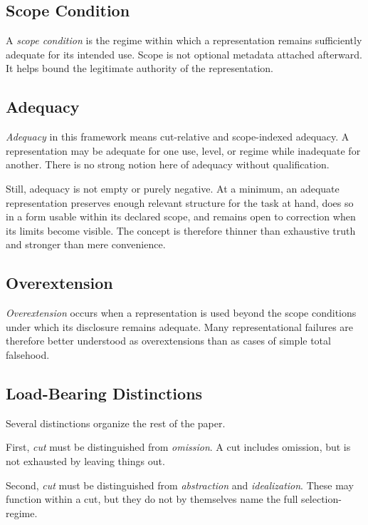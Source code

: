 \documentclass[11pt]{article}
\renewcommand{\emph}[1]{\textit{#1}}
\begin{document}
\subsection{Scope Condition}

A \emph{scope condition} is the regime within which a representation remains sufficiently adequate for its intended use. Scope is not optional metadata attached afterward. It helps bound the legitimate authority of the representation.

\subsection{Adequacy}

\emph{Adequacy} in this framework means cut-relative and scope-indexed adequacy. A representation may be adequate for one use, level, or regime while inadequate for another. There is no strong notion here of adequacy without qualification. \cite{frigg_nguyen_scientific_representation_sep,scientific_pluralism_sep}

Still, adequacy is not empty or purely negative. At a minimum, an adequate representation preserves enough relevant structure for the task at hand, does so in a form usable within its declared scope, and remains open to correction when its limits become visible. The concept is therefore thinner than exhaustive truth and stronger than mere convenience.

\subsection{Overextension}

\emph{Overextension} occurs when a representation is used beyond the scope conditions under which its disclosure remains adequate. Many representational failures are therefore better understood as overextensions than as cases of simple total falsehood. \cite{mitchell_model_cards,gebru_datasheets,nist_explainable_ai}

\subsection{Load-Bearing Distinctions}

Several distinctions organize the rest of the paper.

First, \emph{cut} must be distinguished from \emph{omission}. A cut includes omission, but is not exhausted by leaving things out.

Second, \emph{cut} must be distinguished from \emph{abstraction} and \emph{idealization}. These may function within a cut, but they do not by themselves name the full selection-regime.
\end{document}
